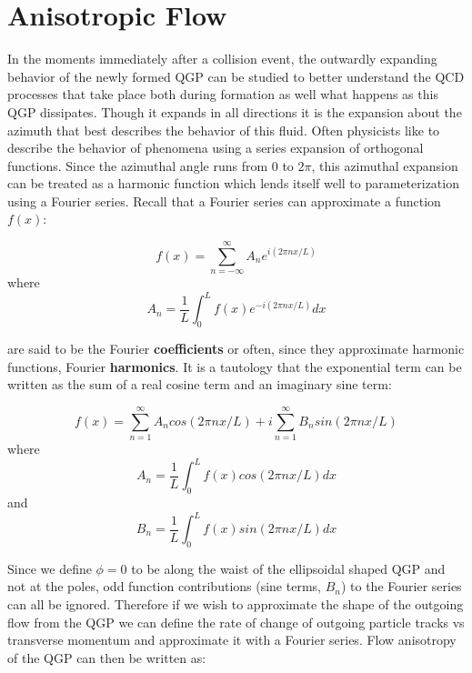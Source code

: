 
\chapter{Anisotropic Flow} %


In the moments immediately after a collision event, the outwardly expanding behavior of the newly formed QGP can be studied to better understand the QCD processes that take place both during formation as well what happens as this QGP dissipates. Though it expands in all directions it is the expansion about the azimuth that best describes the behavior of this fluid. Often physicists like to describe the behavior of phenomena using a series expansion of orthogonal functions. Since the azimuthal angle runs from $0$ to $2 \pi$, this azimuthal expansion can be treated as a harmonic function which lends itself well to parameterization using a Fourier series. Recall that a Fourier series can approximate a function $f(x)$:

\begin{equation}
f(x) = \sum^{\infty}_{n=-\infty} A_{n} e^{i(2 \pi n x / L)}
\end{equation}
where
\begin{equation}
A_{n} = \frac{1}{L} \int^{L}_{0} f(x) e^{-i(2 \pi n x / L)} dx
\end{equation}

are said to be the Fourier \textbf{coefficients} or often, since they approximate harmonic functions, Fourier \textbf{harmonics}. It is a tautology that the exponential term can be written as the sum of a real cosine term and an imaginary sine term:

\begin{equation}
f(x) = \sum^{\infty}_{n=1} A_{n} cos (2 \pi n x / L) + i \sum^{\infty}_{n=1} B_{n} sin (2 \pi n x / L)
\end{equation}
where
\begin{equation}
A_{n} = \frac{1}{L} \int^{L}_{0} f(x) cos (2 \pi n x / L) dx 
\end{equation}
and
\begin{equation}
B_{n} = \frac{1}{L} \int^{L}_{0} f(x) sin (2 \pi n x / L) dx 
\end{equation}

Since we define $\phi=0$ to be along the waist of the ellipsoidal shaped QGP and not at the poles, odd function contributions (sine terms, $B_{n}$) to the Fourier series can all be ignored. 
Therefore if we wish to approximate the shape of the outgoing flow from the QGP we can define the rate of change of outgoing particle tracks vs transverse momentum and approximate it with a Fourier series. Flow anisotropy of the QGP can then be written as:

